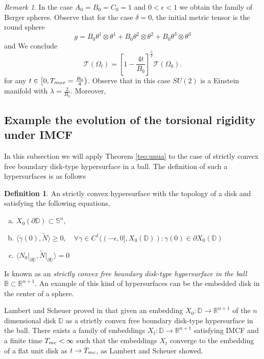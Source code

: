 \documentclass{amsart}
\theoremstyle{definition}
\newtheorem{definition}[theorem]{Definition}
\theoremstyle{remark}
\newtheorem{remark}[theorem]{Remark}
\begin{document}
\begin{remark} In the case $A_0=B_0=C_0=1$ and $0<\epsilon<1$ we obtain the family of Berger spheres.
    Observe that for the case $\delta=0$, the initial metric tensor is the round sphere 
    $$
g=B_0 \theta^1\otimes\theta^1+B_0 \theta^2\otimes\theta^2+B_0\theta^3\otimes\theta^3
    $$
    and We conclude
    $$
\mathcal{T}(\Omega_t)= \left[1-\frac{4t}{B_0}\right]^{\frac{5}{2}}\mathcal{T}(\Omega_0).
    $$
    for any $t\in \left[0,T_{\rm max}=\frac{B_0}{4}\right)$. Observe that in this case $SU(2)$ is a Einstein manifold with $\lambda=\frac{2}{B_0}$. Moreover, 
\end{remark}

\subsection{Example the evolution of the torsional rigidity under IMCF} 
In this subsection we will apply Theorem \ref{teo:unua} to the case of strictly convex free boundary disk-type hypersurface in a ball. The definition of such a hypersurfaces is as follows
\begin{definition}\label{def:fb}
An strictly convex hypersurface with the topology of a disk and satisfying the following equations, 
   \begin{enumerate}[(a)]
       \item $X_0(\partial \mathbb{D})\subset \mathbb{S}^n,$
       \item $\langle \dot\gamma(0),\widetilde{N}\rangle\geq 0,\quad \forall \gamma\in C^1((-\epsilon,0],X_0(\mathbb{D})):\gamma(0)\in \partial X_0(\mathbb{D})$
       \item $\langle N_0\vert_{\partial \mathbb{D}},\widetilde{N}\vert_{\partial \mathbb{D}}\rangle=0$
   \end{enumerate}

Is known as an \emph{strictly convex free boundary disk-type hypersurface in the ball $\mathbb{B}\subset \mathbb{R}^{n+1}$}. An example of this kind of hypersurfaces can be the embedded disk in the center of a sphere. 
\end{definition}

Lambert and Scheuer proved in \cite{Lambert2016inver-34677} that given an embedding $X_0: \mathbb{D}\to \mathbb{R}^{n+1}$ of the $n$ dimensional disk  $\mathbb{D}$ as a strictly convex free boundary disk-type hypersurface in the ball. There exists a family of embeddings  $X_t:\mathbb{D}\to \mathbb{R}^{n+1}$ satisfying IMCF and a finite time $T_{\rm mc}<\infty$ such that the embeddings $X_t$ converge to the embedding of a flat unit disk as $t\to T_{\rm mc}$, as Lambert and Scheuer showed.
\end{document}
